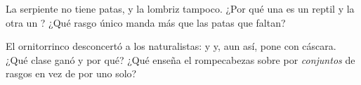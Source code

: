 \begin{exercise}[$\star\star$]\label{exo:g4:classifying-animals:10}
La serpiente no tiene patas, y la lombriz tampoco. ¿Por qué una es un
reptil  y la otra un ? ¿Qué rasgo único manda
más que las patas que faltan?
\end{exercise}

\begin{exercise}[$\star\star\star$]\label{exo:g4:classifying-animals:11}
El ornitorrinco desconcertó a los naturalistas:  y  y, aun
así, pone  con cáscara. ¿Qué clase ganó y por qué? ¿Qué enseña
el rompecabezas sobre  por \emph{conjuntos} de rasgos en vez
de por uno solo?
\end{exercise}
